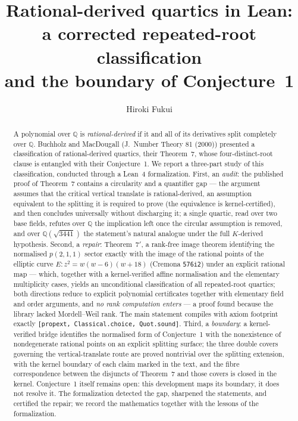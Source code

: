 \documentclass[11pt]{amsart}
\title[Rational-derived quartics in Lean]{Rational-derived quartics in
Lean:\\ a corrected repeated-root classification\\ and the boundary of
Conjecture~1}
\author{Hiroki Fukui}
\newcommand{\Q}{\mathbb{Q}}
\begin{document}
\begin{abstract}
A polynomial over $\Q$ is \emph{rational-derived} if it and all of its
derivatives split completely over $\Q$.  Buchholz and MacDougall
(J.~Number Theory 81 (2000)) presented a classification of
rational-derived quartics, their Theorem~7, whose four-distinct-root
clause is entangled with their Conjecture~1.  We report a three-part
study of this classification, conducted through a Lean~4 formalization.
First, an \emph{audit}: the published proof of Theorem~7 contains a
circularity and a quantifier gap --- the argument assumes that the
critical vertical translate is rational-derived, an assumption
equivalent to the splitting it is required to prove (the equivalence is
kernel-certified), and then concludes universally without discharging
it; a single quartic, read over two base fields, refutes over $\Q$
the implication left once the circular assumption is removed, and over
$\Q(\sqrt{3441})$ the statement's natural analogue under the full
$K$-derived hypothesis.  Second, a \emph{repair}: Theorem~$7'$, a
rank-free image theorem identifying the normalised $p(2,1,1)$ sector
exactly with the image of the rational points of the elliptic curve
$E\colon z^{2}=w(w-6)(w+18)$ (Cremona \texttt{576i2}) under an
explicit rational map --- which, together with a kernel-verified affine
normalisation and the elementary multiplicity cases, yields an
unconditional classification of all repeated-root quartics; both
directions reduce to explicit polynomial
certificates together with elementary field and order arguments, and
\emph{no rank computation enters}
--- a proof found because the library lacked Mordell--Weil rank.  The
main statement compiles with axiom footprint exactly
\texttt{[propext, Classical.choice, Quot.sound]}.  Third, a
\emph{boundary}: a kernel-verified bridge identifies the normalised
form of Conjecture~1 with the nonexistence of nondegenerate rational
points on an explicit splitting surface; the three double covers
governing the vertical-translate route are proved nontrivial over the
splitting extension, with the kernel boundary of each claim marked in
the text, and the fibre correspondence between the disjuncts of
Theorem~7 and those covers is closed in the kernel.  Conjecture~1
itself remains open: this development maps its boundary, it does not
resolve it.  The formalization detected the gap, sharpened the
statements, and certified the repair; we record the mathematics
together with the lessons of the formalization.
\end{abstract}
\end{document}
